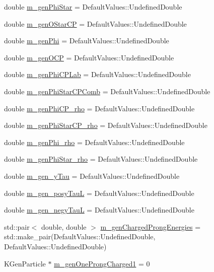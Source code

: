 \begin{DoxyCompactItemize}
\item 
double \hyperlink{classHttProduct_a42f44956643d702be12d765e1eecf960}{m\_\-genPhiStar} = DefaultValues::UndefinedDouble
\item 
double \hyperlink{classHttProduct_ab159ac6f1da38310b236baacbf299ea2}{m\_\-genOStarCP} = DefaultValues::UndefinedDouble
\item 
double \hyperlink{classHttProduct_a0a2c6b3a36ff1a5f90830f63212336da}{m\_\-genPhi} = DefaultValues::UndefinedDouble
\item 
double \hyperlink{classHttProduct_adbf6b4ae920c78e982d14c577d720ad5}{m\_\-genOCP} = DefaultValues::UndefinedDouble
\item 
double \hyperlink{classHttProduct_aec9091c51829b8de6be9303ec1002c7a}{m\_\-genPhiCPLab} = DefaultValues::UndefinedDouble
\item 
double \hyperlink{classHttProduct_a169478ca381091cb1692885ad0a5bac4}{m\_\-genPhiStarCPComb} = DefaultValues::UndefinedDouble
\item 
double \hyperlink{classHttProduct_a91a52a64c8c738cbb842fe389c60c07d}{m\_\-genPhiCP\_\-rho} = DefaultValues::UndefinedDouble
\item 
double \hyperlink{classHttProduct_a64b92a877f8d6ad7a514214e1929c342}{m\_\-genPhiStarCP\_\-rho} = DefaultValues::UndefinedDouble
\item 
double \hyperlink{classHttProduct_a2fe4a315ccbd2834d619db751d842cb8}{m\_\-genPhi\_\-rho} = DefaultValues::UndefinedDouble
\item 
double \hyperlink{classHttProduct_a8d816230bd59c76d77a3833858e8434c}{m\_\-genPhiStar\_\-rho} = DefaultValues::UndefinedDouble
\item 
double \hyperlink{classHttProduct_a0c74881d1d4b145b91ec71d49e18fa63}{m\_\-gen\_\-yTau} = DefaultValues::UndefinedDouble
\item 
double \hyperlink{classHttProduct_a4ed4969177d24dcd0ffa92970479cb5f}{m\_\-gen\_\-posyTauL} = DefaultValues::UndefinedDouble
\item 
double \hyperlink{classHttProduct_a2513cc424cf38a9c992c6c51d01234b5}{m\_\-gen\_\-negyTauL} = DefaultValues::UndefinedDouble
\item 
std::pair$<$ double, double $>$ \hyperlink{classHttProduct_a6f852191cf4b853424e8b4c4b3202160}{m\_\-genChargedProngEnergies} = std::make\_\-pair(DefaultValues::UndefinedDouble, DefaultValues::UndefinedDouble)
\item 
KGenParticle $\ast$ \hyperlink{classHttProduct_a53a29768acceece5863f783c114d7e2f}{m\_\-genOneProngCharged1} = 0

\end{DoxyCompactItemize}
